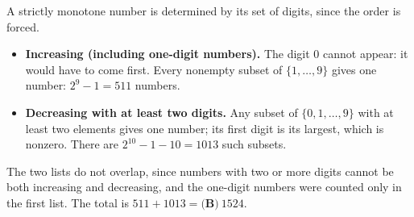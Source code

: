 A strictly monotone number is determined by its set of digits, since the order is forced.
\begin{itemize}
\item \textbf{Increasing (including one-digit numbers).} The digit $0$ cannot appear: it would have to come first. Every nonempty subset of $\{1,\dots,9\}$ gives one number: $2^9-1=511$ numbers.
\item \textbf{Decreasing with at least two digits.} Any subset of $\{0,1,\dots,9\}$ with at least two elements gives one number; its first digit is its largest, which is nonzero. There are $2^{10}-1-10=1013$ such subsets.
\end{itemize}
The two lists do not overlap, since numbers with two or more digits cannot be both increasing and decreasing, and the one-digit numbers were counted only in the first list. The total is $511+1013=\boxed{\textbf{(B)}\ 1524}$.
